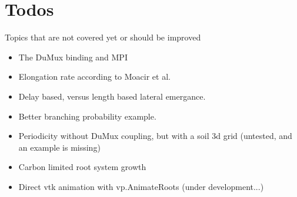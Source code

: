 
\newpage
\section{Todos}
Topics that are not covered yet or should be improved

\begin{itemize}

\item The DuMux binding and MPI

\item Elongation rate according to Moacir et al.

\item Delay based, versus length based lateral emergance.

\item Better branching probability example.

\item Periodicity without DuMux coupling, but with a soil 3d grid (untested, and an example is missing)

\item Carbon limited root system growth

\item Direct vtk animation with vp.AnimateRoots (under development...)

\end{itemize}

